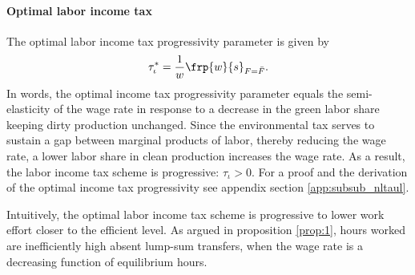 
\paragraph{Optimal labor income tax}
The optimal labor income tax progressivity parameter is given by 
\begin{align}\label{eq:nls_taulopt}
\tau_\iota^*=\frac{1}{w}\frp{w}{s}_{F=\bar{F}}.
\end{align}
In words, the optimal income tax progressivity parameter equals the semi-elasticity of the wage rate in response to a decrease in the green labor share keeping dirty production unchanged. 
Since the environmental tax serves to sustain a gap between marginal products of labor, thereby  reducing the wage rate, a lower labor share in clean production increases the wage rate. As a result, the labor income tax scheme is progressive: $\tau_\iota>0$. For a proof and the derivation of the optimal income tax progressivity see appendix section \ref{app:subsub_nltaul}.

Intuitively, the optimal labor income tax scheme is progressive to lower work effort closer to the efficient level. As argued in proposition \ref{prop:1}, hours worked are inefficiently high absent lump-sum transfers, when the wage rate is a decreasing function of equilibrium hours. 
 
% 
 


